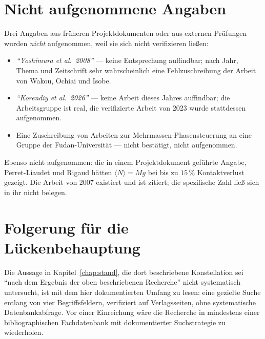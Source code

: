\documentclass[12pt,a4paper]{report}
\begin{document}
\section{Nicht aufgenommene Angaben}

Drei Angaben aus früheren Projektdokumenten oder aus externen
Prüfungen wurden \emph{nicht} aufgenommen, weil sie sich nicht
verifizieren ließen:

\begin{itemize}
\item \emph{``Yoshimura et al.\ 2008''} --- keine Entsprechung
      auffindbar; nach Jahr, Thema und Zeitschrift sehr wahrscheinlich
      eine Fehlzuschreibung der Arbeit von Wakou, Ochiai und Isobe.
\item \emph{``Korendiy et al.\ 2026''} --- keine Arbeit dieses Jahres
      auffindbar; die Arbeitsgruppe ist real, die verifizierte Arbeit
      von 2023 wurde stattdessen aufgenommen.
\item Eine Zuschreibung von Arbeiten zur Mehrmassen-Phasensteuerung an
      eine Gruppe der Fudan-Universität --- nicht bestätigt, nicht
      aufgenommen.
\end{itemize}

Ebenso nicht aufgenommen: die in einem Projektdokument geführte Angabe,
Perret-Liaudet und Rigaud hätten $\langle N \rangle = Mg$ bei bis zu
$15\,\%$ Kontaktverlust gezeigt. Die Arbeit von 2007 existiert und ist
zitiert; die spezifische Zahl ließ sich in ihr nicht belegen.

\section{Folgerung für die Lückenbehauptung}

Die Aussage in Kapitel~\ref{chap:stand}, die dort beschriebene
Konstellation sei ``nach dem Ergebnis der oben beschriebenen
Recherche'' nicht systematisch untersucht, ist mit dem hier
dokumentierten Umfang zu lesen: eine gezielte Suche entlang von vier
Begriffsfeldern, verifiziert auf Verlagsseiten, ohne systematische
Datenbankabfrage. Vor einer Einreichung wäre die Recherche in
mindestens einer bibliographischen Fachdatenbank mit dokumentierter
Suchstrategie zu wiederholen.





\end{document}
